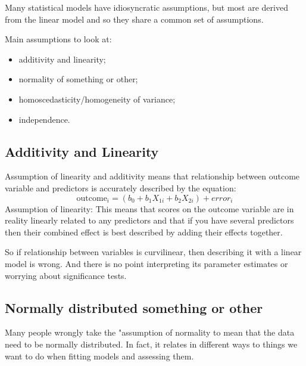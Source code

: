 Many statistical models have idiosyncratic assumptions, but most are derived from the linear model and so they share a common set of assumptions. 

Main assumptions to look at:
\begin{itemize}
\item additivity and linearity;
\item normality of something or other;
\item homoscedasticity/homogeneity of variance;
\item independence.
\end{itemize}

\subsection{Additivity and Linearity}

Assumption of linearity and additivity means that relationship between outcome variable and predictors is accurately described by the equation:
\begin{equation}
\text{outcome}_i = (b_0 + b_1X_{1i} + b_2X_{2i}) + error_i
\end{equation}
Assumption of linearity: This means that scores on the outcome variable are in reality linearly related to any predictors and that if you have several predictors then their combined effect is best described by adding their effects together. 

So if relationship between variables is curvilinear, then describing it with a linear model is wrong. And there is no point interpreting its parameter estimates or worrying about significance tests.

\subsection{Normally distributed something or other}

Many people wrongly take the "assumption of normality to mean that the data need to be normally distributed. In fact, it relates in different ways to things we want to do when fitting models and assessing them. 

